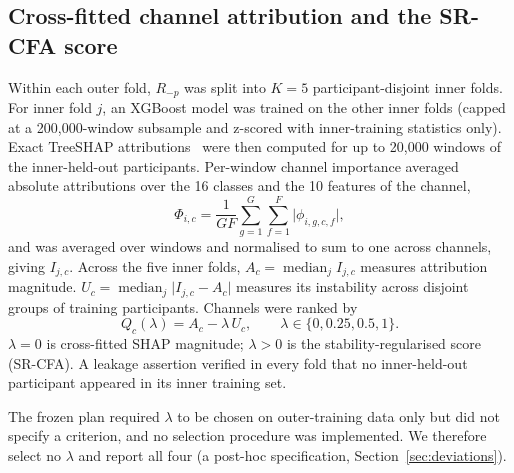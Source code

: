 \subsection{Cross-fitted channel attribution and the SR-CFA score}
Within each outer fold, $R_{-p}$ was split into $K = 5$ participant-disjoint inner folds. For inner fold $j$, an XGBoost model was trained on the other inner folds (capped at a  200,000-window subsample and z-scored with inner-training statistics only). Exact TreeSHAP attributions~\cite{lundberg2020local} were then computed for up to 20,000 windows of the inner-held-out participants. Per-window channel importance averaged absolute attributions over the 16 classes and the 10 features of the channel,
\begin{equation}
\Phi_{i,c} = \frac{1}{G F}\sum_{g=1}^{G}\sum_{f=1}^{F} \lvert \phi_{i,g,c,f} \rvert ,
\end{equation}
and was averaged over windows and normalised to sum to one across channels, giving $I_{j,c}$. Across the five inner folds, $A_c = \operatorname{median}_j I_{j,c}$ measures attribution magnitude. $U_c = \operatorname{median}_j \lvert I_{j,c} - A_c \rvert$ measures its instability across disjoint groups of training participants. Channels were ranked  by
\begin{equation}
Q_c(\lambda) = A_c - \lambda\, U_c , \qquad \lambda \in \{0, 0.25, 0.5, 1\}.
\label{eq:srcfa}
\end{equation}
$\lambda = 0$ is cross-fitted SHAP magnitude; $\lambda > 0$ is the stability-regularised score (SR-CFA). A leakage assertion verified in every fold that no inner-held-out participant appeared in its inner training set. 

The frozen plan required $\lambda$ to be chosen on outer-training data only but did not specify a criterion, and no selection procedure was implemented. We therefore select no $\lambda$ and report all four (a post-hoc specification, Section~\ref{sec:deviations}).

